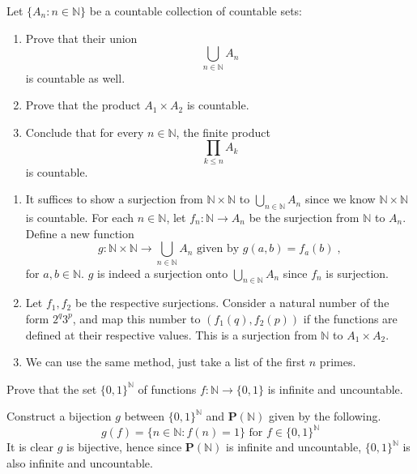 \documentclass[../main.tex]{subfiles}
\begin{document}
\begin{problem}[2]
    Let $\{ A_n : n \in \mathbb{N} \}$ be a countable collection of countable sets:
    \begin{enumerate}[label=(\alph*)]
        \item Prove that their union
            \[ \bigcup_{n \in \mathbb{N}} A_n \]
            is countable as well.
        \item Prove that the product $A_1 \times A_2$ is countable.
        \item Conclude that for every $n \in \mathbb{N}$, the finite product
            \[ \prod_{k \le n} A_k \]
            is countable.
    \end{enumerate}
\end{problem}
\begin{enumerate}[label=(\alph*)]
    \item It suffices to show a surjection from $\mathbb{N} \times \mathbb{N}$ to $\bigcup_{n \in \mathbb{N}} A_n$ since we know $\mathbb{N} \times \mathbb{N}$ is countable.
        For each $n \in \mathbb{N}$, let $f_n: \mathbb{N} \to A_n$ be the surjection from $\mathbb{N}$ to $A_n$.
        Define a new function
        \[
            g : \mathbb{N} \times \mathbb{N} \to \bigcup_{n \in \mathbb{N}} A_n \text{ given by } g(a, b) = f_a(b) \; ,
        \]
        for $a, b \in \mathbb{N}$.
        $g$ is indeed a surjection onto $\bigcup_{n \in \mathbb{N}} A_n$ since $f_n$ is surjection.
    \item Let $f_1, f_2$ be the respective surjections.
        Consider a natural number of the form $2^q 3^p$, and map this number to $(f_1(q), f_2(p))$ if the functions are defined at their respective values.
        This is a surjection from $\mathbb{N}$ to $A_1 \times A_2$.
    \item We can use the same method, just take a list of the first $n$ primes.
\end{enumerate}

\begin{problem}[3]
    Prove that the set $\{ 0, 1 \}^{\mathbb{N}}$ of functions $f : \mathbb{N} \to \{ 0, 1 \}$ is infinite and uncountable.
\end{problem}
Construct a bijection $g$ between $\{ 0, 1 \}^{\mathbb{N}}$ and $\mathbf{P}(\mathbb{N})$ given by the following.
\[
    g(f) = \{ n \in \mathbb{N} : f(n) = 1 \} \text{ for } f \in \{ 0, 1 \}^{\mathbb{N}}
\]
It is clear $g$ is bijective, hence since $\mathbf{P}(\mathbb{N})$ is infinite and uncountable, $\{ 0, 1 \}^{\mathbb{N}}$ is also infinite and uncountable.
\end{document}
